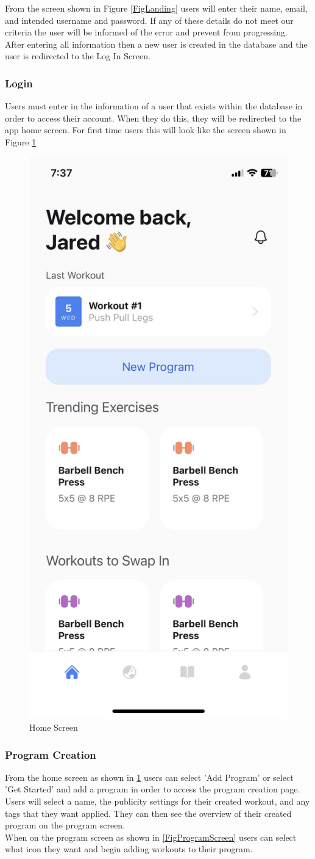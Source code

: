 \documentclass{article}
\begin{document}
From the screen shown in Figure \ref{FigLanding} users will enter their name, email, and intended username and password. If any of these details do not meet our criteria the user will be informed of the error and prevent from progressing.\\
After entering all information then a new user is created in the database and the user is redirected to the Log In Screen.

\subsubsection{Login}

Users must enter in the information of a user that exists within the database in order to access their account. When they do this, they will be redirected to the app home screen. For first time users this will look like the screen shown in Figure \ref{FigHomeScreen} 

\begin{figure}[H]
    \centering
    \includegraphics[height=0.6\textwidth]{imgs/LastWorkout.jpg}
    \caption{Home Screen}
    \label{FigHomeScreen}
    \end{figure}

\subsubsection{Program Creation}

From the home screen as shown in \ref{FigHomeScreen} users can select 'Add Program' or select 'Get Started' and add a program in order to access the program creation page.\\
Users will select a name, the publicity settings for their created workout, and any tags that they want applied. They can then see the overview of their created program on the program screen.\\
When on the program screen as shown in \ref{FigProgramScreen} users can select what icon they want and begin adding workouts to their program.
\end{document}
